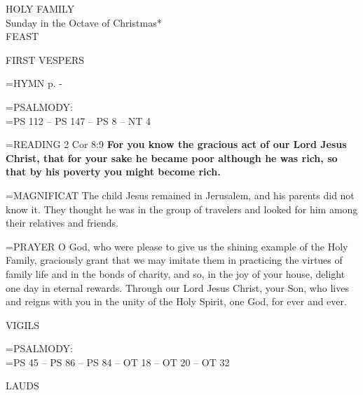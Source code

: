 \begin{center}\normalsize HOLY FAMILY\\
\footnotesize Sunday in the Octave of Christmas*\\
\footnotesize FEAST\\
\end{center}

\begin{flushleft}\normalsize FIRST VESPERS\\\end{flushleft}

\hangindent=\parindent \small{\uppercase{HYMN} p.  \pageref{christmas:firstHymn} - \pageref{christmas:lastHymn}\\}

\hangindent=\parindent \small{PSALMODY:}\\
\hangindent=\parindent  PS 112 -- PS 147 -- PS 8 -- NT 4\vspace{0.5em}


\hangindent=\parindent \small{READING}    2 Cor 8:9 \textbf{   For you know the gracious act of our Lord Jesus Christ, that for your sake he became poor although he was rich, so that by his poverty you might become rich. \\}

\hangindent=\parindent \small{MAGNIFICAT 	The child Jesus remained in Jerusalem, and his parents did not know it. They thought he was in the group of travelers and looked for him among their relatives and friends.\\}

\hangindent=\parindent \small{PRAYER 	O God, who were please to give us the shining example of the Holy Family, graciously grant that we may imitate them in practicing the virtues of family life and in the bonds of charity, and so, in the joy of your house, delight one day in eternal rewards. Through our Lord Jesus Christ, your Son, who lives and reigns with you in the unity of the Holy Spirit, one God, for ever and ever.}

\begin{flushleft}\normalsize VIGILS\\\end{flushleft}

\hangindent=\parindent \small{PSALMODY:}\\
\hangindent=\parindent  PS 45 -- PS 86 -- PS 84 -- OT 18 -- OT 20 -- OT 32\vspace{0.5em}

\begin{flushleft}\normalsize LAUDS\\\end{flushleft}

